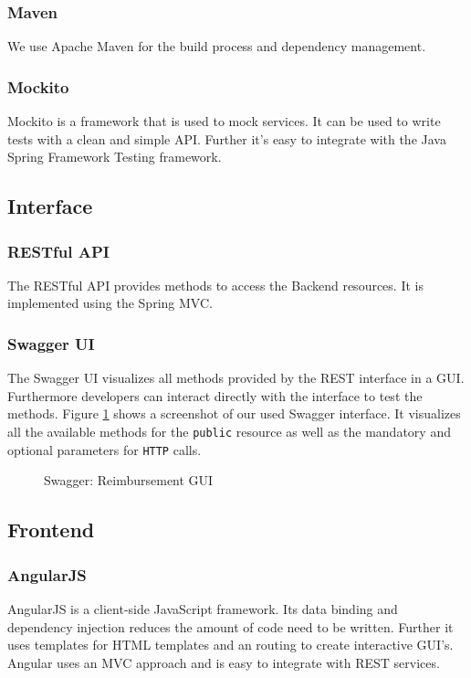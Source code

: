 \subsubsection{Maven}
We use Apache Maven \cite{maven} for the build process and dependency management.

\subsubsection{Mockito}
Mockito is a framework that is used to mock services. It can be used to write tests with a clean and simple API. Further it's easy to integrate with the Java Spring Framework Testing framework. \cite{mockito}

\subsection{Interface}

\subsubsection{RESTful API}
The RESTful API provides methods to access the Backend resources. It is implemented using the Spring MVC. 

\subsubsection{Swagger UI}
The Swagger UI visualizes all methods provided by the REST interface in a GUI. Furthermore developers can interact directly with the interface to test the methods. Figure \ref{fig:swagger01} shows a screenshot of our used Swagger interface. It visualizes all the available methods for the \texttt{public} resource as well as the mandatory and optional parameters for \texttt{HTTP} calls. \cite{swagger}

\begin{figure}[H]
    \centering
    \caption{Swagger: Reimbursement GUI}
    \label{fig:swagger01}
\end{figure}

\subsection{Frontend}

\subsubsection{AngularJS}
AngularJS is a client-side JavaScript framework. Its data binding and dependency injection reduces the amount of code need to be written. Further it uses templates for HTML templates and an routing to create interactive GUI's. Angular uses an MVC approach and is easy to integrate with REST services. \cite{angular}   

